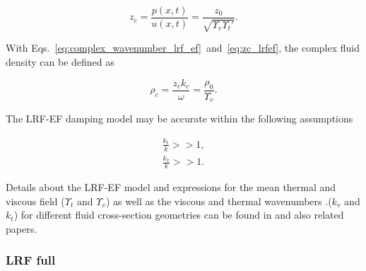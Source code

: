 \documentclass[12pt]{article}
\begin{document}
\begin{equation} \label{eq:zc_lrfef}
	z_c = \frac{p(x,t)}{u(x,t)} = \frac{z_0}{\sqrt{\Upsilon_v \Upsilon_t'}}.
\end{equation}

\noindent With Eqs.~\ref{eq:complex_wavenumber_lrf_ef}~and~\ref{eq:zc_lrfef}, the complex fluid density can be defined as

\begin{equation}
	\rho_{c} = \frac{ z_c k_c }{ \omega  } =\frac{ \rho_{0} }{ \Upsilon_v  }.
\end{equation}

\noindent The \acrshort{LRF-EF} damping model may be accurate within the following assumptions \cite{kampinga_phdthesis} 

\begin{gather}
	\frac{ k_{\text{t}} }{ k } >> 1, \\
	\frac{ k_{\text{v}} }{ k } >> 1.	
\end{gather}

Details about the \acrshort{LRF-EF} model and expressions for the mean thermal and viscous field ($\Upsilon_t$ and $\Upsilon_v$) as well as the viscous and thermal wavenumbers .($k_v$ and $k_t$) for different fluid cross-section geometries can be found in \cite[pp.62 and 63 and Appendix A in][]{kampinga_phdthesis} and also related papers.

%
%
%
%

\subsubsection{LRF full} \label{subsubsec:lrffull_damp}
\end{document}
